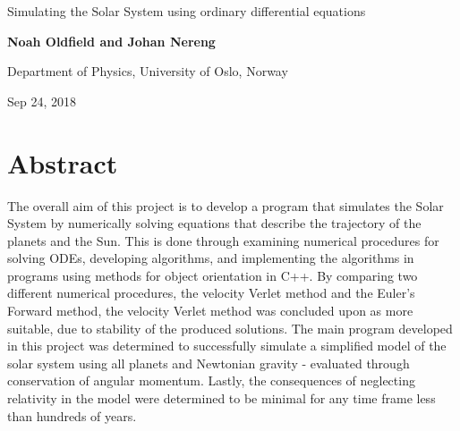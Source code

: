 \documentclass[%
oneside,                 %
final,                   %
10pt]{article}
\begin{document}

\newcommand{\exercisesection}[1]{\subsection*{#1}}






\thispagestyle{empty}

\begin{center}
{\LARGE\bf
\begin{spacing}{1.25}
Simulating the Solar System using ordinary differential equations
\end{spacing}
}
\end{center}


\begin{center}
{\bf Noah Oldfield and Johan Nereng}
\end{center}

    \begin{center}
\centerline{{\small Department of Physics, University of Oslo, Norway}}
\end{center}
    

\begin{center}
Sep 24, 2018
\end{center}

\vspace{1cm}

\section{Abstract}
The overall aim of this project is to develop a program that simulates the Solar System by numerically solving equations that describe the trajectory of the planets and the Sun. This is done through examining numerical procedures for solving ODEs, developing algorithms, and implementing the algorithms in programs using methods for object orientation in C++. By comparing two different numerical procedures, the velocity Verlet method and the Euler's Forward method, the velocity Verlet method was concluded upon as more suitable, due to stability of the produced solutions. The main program developed in this project was determined to successfully simulate a simplified model of the solar system using all planets and Newtonian gravity - evaluated through conservation of angular momentum. Lastly, the consequences of neglecting relativity in the model were determined to be minimal for any time frame less than hundreds of years.
\end{document}
